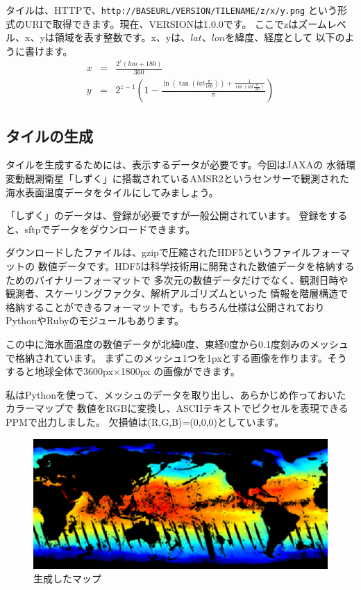 \documentclass[mingoth,a4paper]{jsarticle}
\begin{document}
タイルは、HTTPで、\texttt{http://BASEURL/VERSION/TILENAME/z/x/y.png} という形式のURIで取得できます。現在、VERSIONは1.0.0です。
ここでzはズームレベル、x、yは領域を表す整数です。x、yは、$lat$、$lon$を緯度、経度として
以下のように書けます\cite{ref:tilename}。
\begin{eqnarray*}
x &=& \frac{2^z(lon + 180)}{360}\\
y &=& 2^{z-1}(1-\frac{\ln(\tan(lat\frac{\pi}{180})) + \frac{1}{\cos(lat\frac{\pi}{180})}
}{\pi})
\end{eqnarray*}

\subsection{タイルの生成}
タイルを生成するためには、表示するデータが必要です。今回はJAXAの
水循環変動観測衛星「しずく」に搭載されているAMSR2というセンサーで観測された
海水表面温度データをタイルにしてみましょう。

「しずく」のデータは、登録が必要ですが一般公開されています\cite{ref:gcom_w1}。
登録をすると、sftpでデータをダウンロードできます。
%
%
ダウンロードしたファイルは、gzipで圧縮されたHDF5というファイルフォーマットの
数値データです。HDF5は科学技術用に開発された数値データを格納するためのバイナリーフォーマットで
多次元の数値データだけでなく、観測日時や観測者、スケーリングファクタ、解析アルゴリズムといった
情報を階層構造で格納することができるフォーマットです。もちろん仕様は公開されており
PythonやRubyのモジュールもあります。

この中に海水面温度の数値データが北緯0度、東経0度から0.1度刻みのメッシュで格納されています。
まずこのメッシュ1つを1pxとする画像を作ります。そうすると地球全体で3600px$\times$1800px
の画像ができます。

私はPythonを使って、メッシュのデータを取り出し、あらかじめ作っておいたカラーマップで
数値をRGBに変換し、ASCIIテキストでピクセルを表現できるPPMで出力しました。
欠損値は(R,G,B)=(0,0,0)としています。
\begin{figure}[hbp]
\centering
\includegraphics{image201408/map.eps}
\caption{生成したマップ}
\label{fig:map}
\end{figure}
\end{document}
